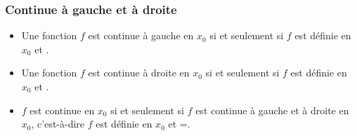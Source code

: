 \subsubsection{Continue à gauche et à droite}%
\begin{definition}[s]
	\begin{itemize}
		\item Une fonction $f$ est continue à gauche en $x_0$ si et seulement si $f$ est définie en $x_0$ et .
		\item Une fonction $f$ est continue à droite en $x_0$ si et seulement si $f$ est définie en $x_0$ et .
		\item $f$ est continue en $x_0$ si et seulement si $f$ est continue à gauche et à droite en $x_0$, c'est-à-dire $f$ est définie en $x_0$ et =.
	\end{itemize}
\end{definition}%
